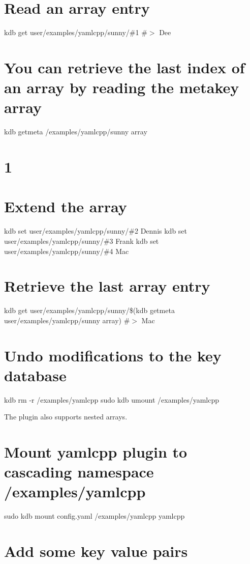 \section*{Read an array entry}

kdb get user/examples/yamlcpp/sunny/\#1 \#$>$ Dee

\section*{You can retrieve the last index of an array by reading the metakey {\ttfamily array}}

kdb getmeta /examples/yamlcpp/sunny array \section*{1}

\section*{Extend the array}

kdb set user/examples/yamlcpp/sunny/\#2 Dennis kdb set user/examples/yamlcpp/sunny/\#3 Frank kdb set user/examples/yamlcpp/sunny/\#4 Mac

\section*{Retrieve the last array entry}

kdb get user/examples/yamlcpp/sunny/\$(kdb getmeta user/examples/yamlcpp/sunny array) \#$>$ Mac

\section*{Undo modifications to the key database}

kdb rm -\/r /examples/yamlcpp sudo kdb umount /examples/yamlcpp 
\begin{DoxyCode}
The plugin also supports nested arrays.
\end{DoxyCode}
 \section*{Mount yamlcpp plugin to cascading namespace {\ttfamily /examples/yamlcpp}}

sudo kdb mount config.\+yaml /examples/yamlcpp yamlcpp

\section*{Add some key value pairs}

